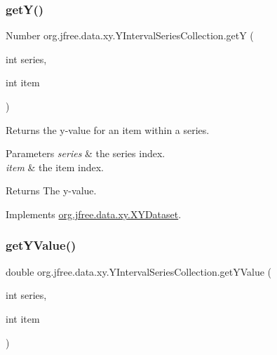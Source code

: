 \mbox{\label{classorg_1_1jfree_1_1data_1_1xy_1_1_y_interval_series_collection_a68019ee85c039bec59b0a3a61989d131}} 
\subsubsection{\texorpdfstring{get\+Y()}{getY()}}
{\footnotesize\ttfamily Number org.\+jfree.\+data.\+xy.\+Y\+Interval\+Series\+Collection.\+getY (\begin{DoxyParamCaption}\item[{int}]{series,  }\item[{int}]{item }\end{DoxyParamCaption})}

Returns the y-\/value for an item within a series.


\begin{DoxyParams}{Parameters}
{\em series} & the series index. \\
\hline
{\em item} & the item index.\\
\hline
\end{DoxyParams}
\begin{DoxyReturn}{Returns}
The y-\/value. 
\end{DoxyReturn}


Implements \mbox{\hyperlink{interfaceorg_1_1jfree_1_1data_1_1xy_1_1_x_y_dataset_aa915867221e0f94021bad3140db5254e}{org.\+jfree.\+data.\+xy.\+X\+Y\+Dataset}}.

\mbox{\label{classorg_1_1jfree_1_1data_1_1xy_1_1_y_interval_series_collection_a741571e5d370b9f083cea6419b417954}} 
\subsubsection{\texorpdfstring{get\+Y\+Value()}{getYValue()}}
{\footnotesize\ttfamily double org.\+jfree.\+data.\+xy.\+Y\+Interval\+Series\+Collection.\+get\+Y\+Value (\begin{DoxyParamCaption}\item[{int}]{series,  }\item[{int}]{item }\end{DoxyParamCaption})}

